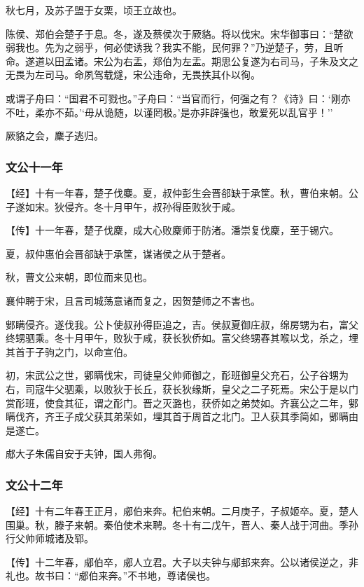 \documentclass[]{article}
\begin{document}
秋七月，及苏子盟于女栗，顷王立故也。

陈侯、郑伯会楚子于息。冬，遂及蔡侯次于厥貉。将以伐宋。宋华御事曰：``楚欲弱我也。先为之弱乎，何必使诱我？我实不能，民何罪？''乃逆楚子，劳，且听命。遂道以田孟诸。宋公为右盂，郑伯为左盂。期思公复遂为右司马，子朱及文之无畏为左司马。命夙驾载燧，宋公违命，无畏抶其仆以徇。

或谓子舟曰：``国君不可戮也。''子舟曰：``当官而行，何强之有？《诗》曰：`刚亦不吐，柔亦不茹。'`毋从诡随，以谨罔极。'是亦非辟强也，敢爱死以乱官乎！''

厥貉之会，麇子逃归。

\hypertarget{header-n1173}{%
\subsubsection{文公十一年}\label{header-n1173}}

【经】十有一年春，楚子伐麋。夏，叔仲彭生会晋郤缺于承筐。秋，曹伯来朝。公子遂如宋。狄侵齐。冬十月甲午，叔孙得臣败狄于咸。

【传】十一年春，楚子伐麇，成大心败麇师于防渚。潘崇复伐麇，至于锡穴。

夏，叔仲惠伯会晋郤缺于承筐，谋诸侯之从于楚者。

秋，曹文公来朝，即位而来见也。

襄仲聘于宋，且言司城荡意诸而复之，因贺楚师之不害也。

鄋瞒侵齐。遂伐我。公卜使叔孙得臣追之，吉。侯叔夏御庄叔，绵房甥为右，富父终甥驷乘。冬十月甲午，败狄于咸，获长狄侨如。富父终甥舂其喉以戈，杀之，埋其首于子驹之门，以命宣伯。

初，宋武公之世，鄋瞒伐宋，司徒皇父帅师御之，耏班御皇父充石，公子谷甥为右，司寇牛父驷乘，以败狄于长丘，获长狄缘斯，皇父之二子死焉。宋公于是以门赏耏班，使食其征，谓之耏门。晋之灭潞也，获侨如之弟焚如。齐襄公之二年，鄋瞒伐齐，齐王子成父获其弟荣如，埋其首于周首之北门。卫人获其季简如，鄋瞒由是遂亡。

郕大子朱儒自安于夫钟，国人弗徇。

\hypertarget{header-n1184}{%
\subsubsection{文公十二年}\label{header-n1184}}

【经】十有二年春王正月，郕伯来奔。杞伯来朝。二月庚子，子叔姬卒。夏，楚人围巢。秋，滕子来朝。秦伯使术来聘。冬十有二戊午，晋人、秦人战于河曲。季孙行父帅师城诸及郓。

【传】十二年春，郕伯卒，郕人立君。大子以夫钟与郕邽来奔。公以诸侯逆之，非礼也。故书曰：``郕伯来奔。''不书地，尊诸侯也。
\end{document}
